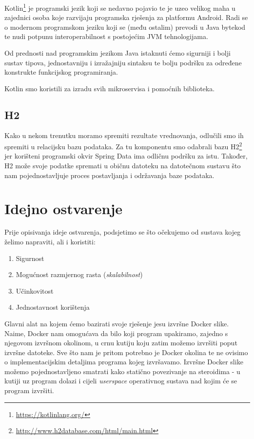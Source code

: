 \documentclass[times, utf8, zavrsni]{fer}
\begin{document}
Kotlin{\footnote{\url{https://kotlinlang.org/}}} je programski jezik koji se nedavno pojavio te je uzeo velikog maha u zajednici osoba koje razvijaju programska rješenja za platformu Android. Radi se o modernom programskom jeziku koji se (među ostalim) prevodi u Java bytekod te nudi potpunu interoperabilnost s postojećim JVM tehnologijama.

Od prednosti nad programskim jezikom Java istaknuti ćemo sigurniji i bolji sustav tipova, jednostavniju i izražajniju sintaksu te bolju podršku za određene konstrukte funkcijskog programiranja.

Kotlin smo koristili za izradu svih mikroservisa i pomoćnih biblioteka. 

\subsection{H2}

Kako u nekom trenutku moramo spremiti rezultate vrednovanja, odlučili smo ih spremiti u relacijsku bazu podataka. Za tu komponentu smo odabrali bazu H2{\footnote{\url{http://www.h2database.com/html/main.html}}} jer korišteni programski okvir Spring Data ima odličnu podršku za istu. Također, H2 može svoje podatke spremati u običnu datoteku na datotečnom sustavu što nam pojednostavljuje proces postavljanja i održavanja baze podataka.

\section{Idejno ostvarenje}

Prije opisivanja ideje ostvarenja, podsjetimo se što očekujemo od sustava kojeg želimo napraviti, ali i koristiti:

\begin{enumerate}
\item Sigurnost
\item Mogućnost razmjernog rasta (\textit{skalabilnost})
\item Učinkovitost
\item Jednostavnost korištenja
\end{enumerate}

Glavni alat na kojem ćemo bazirati svoje rješenje jesu izvršne Docker slike. Naime, Docker nam omogućava da bilo koji program upakiramo, zajedno s njegovom izvršnom okolinom, u crnu kutiju koju zatim možemo izvršiti poput izvršne datoteke. Sve što nam je pritom potrebno je Docker okolina te ne ovisimo o implementacijskim detaljima programa kojeg izvršavamo. Izvršne Docker slike možemo pojednostavljeno smatrati kako statično povezivanje na steroidima - u kutiji uz program dolazi i cijeli \textit{userspace} operativnog sustava nad kojim će se program izvršiti.
\end{document}
